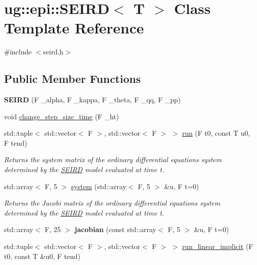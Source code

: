 \hypertarget{classug_1_1epi_1_1_s_e_i_r_d}{}\section{ug\+:\+:epi\+:\+:S\+E\+I\+RD$<$ T $>$ Class Template Reference}
\label{classug_1_1epi_1_1_s_e_i_r_d}


{\ttfamily \#include $<$seird.\+h$>$}

\subsection*{Public Member Functions}
\begin{DoxyCompactItemize}
\item 
\mbox{\label{classug_1_1epi_1_1_s_e_i_r_d_afa071cf690a6fbb94ded02abdec47a8a}} 
{\bfseries S\+E\+I\+RD} (F \+\_\+alpha, F \+\_\+kappa, F \+\_\+theta, F \+\_\+qq, F \+\_\+pp)
\item 
void \hyperlink{classug_1_1epi_1_1_s_e_i_r_d_a537a6879b4a4d238d0141aaee478a1a8}{change\+\_\+step\+\_\+size\+\_\+time} (F \+\_\+ht)
\item 
std\+::tuple$<$ std\+::vector$<$ F $>$, std\+::vector$<$ F $>$ $>$ \hyperlink{classug_1_1epi_1_1_s_e_i_r_d_ae1b0b3727a9b5eb9afe1f41985a74967}{run} (F t0, const T u0, F tend)
\begin{DoxyCompactList}\small\item\em Returns the system matrix of the ordinary differential equations system determined by the \hyperlink{classug_1_1epi_1_1_s_e_i_r_d}{S\+E\+I\+RD} model evaluated at time t. \end{DoxyCompactList}\item 
\mbox{\label{classug_1_1epi_1_1_s_e_i_r_d_a654ab9e70a1efe5a5fd8b0534cd14a37}} 
std\+::array$<$ F, 5 $>$ \hyperlink{classug_1_1epi_1_1_s_e_i_r_d_a654ab9e70a1efe5a5fd8b0534cd14a37}{system} (std\+::array$<$ F, 5 $>$ \&u, F t=0)
\begin{DoxyCompactList}\small\item\em Returns the Jacobi matrix of the ordinary differential equations system determined by the \hyperlink{classug_1_1epi_1_1_s_e_i_r_d}{S\+E\+I\+RD} model evaluated at time t. \end{DoxyCompactList}\item 
\mbox{\label{classug_1_1epi_1_1_s_e_i_r_d_a97e809ff18e08d75269af918eced73d1}} 
std\+::array$<$ F, 25 $>$ {\bfseries jacobian} (const std\+::array$<$ F, 5 $>$ \&u, F t=0)
\item 
std\+::tuple$<$ std\+::vector$<$ F $>$, std\+::vector$<$ F $>$ $>$ \hyperlink{classug_1_1epi_1_1_s_e_i_r_d_a4b2848690a22845a5164345ad43393a8}{run\+\_\+linear\+\_\+implicit} (F t0, const T \&u0, F tend)
\end{DoxyCompactItemize}
